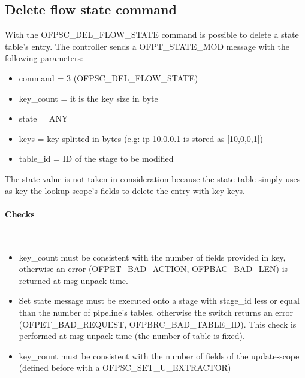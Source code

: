 \subsection{Delete flow state command}
\label{subsec:del_flow}
With the OFPSC\_DEL\_FLOW\_STATE command is possible to delete a state table's entry.
The controller sends a OFPT\_STATE\_MOD message with the following parameters:
\begin{itemize}
\setlength\itemsep{0em}
\item command = 3 (OFPSC\_DEL\_FLOW\_STATE)
\item key\_count = it is the key size in byte
\item state = ANY
\item keys = key splitted in bytes (e.g: ip 10.0.0.1 is stored as [10,0,0,1])
\item table\_id = ID of the stage to be modified
\end{itemize}

The state value is not taken in consideration because the state table simply uses as key the lookup-scope's fields to delete the entry with key keys.
\paragraph{Checks}\mbox{}\\
\begin{itemize}
\setlength\itemsep{0em}
\item key\_count must be consistent with the number of fields provided in key, otherwise an error (OFPET\_BAD\_ACTION, OFPBAC\_BAD\_LEN) is returned at msg unpack time. 
\item Set state message must be executed onto a stage with stage\_id less or equal than the number of pipeline’s tables, otherwise the switch returns an error (OFPET\_BAD\_REQUEST, OFPBRC\_BAD\_TABLE\_ID). This check is performed at msg unpack time (the number of table is fixed).
\item key\_count must be consistent with the number of fields of the update-scope (defined before with a OFPSC\_SET\_U\_EXTRACTOR)
\end{itemize}